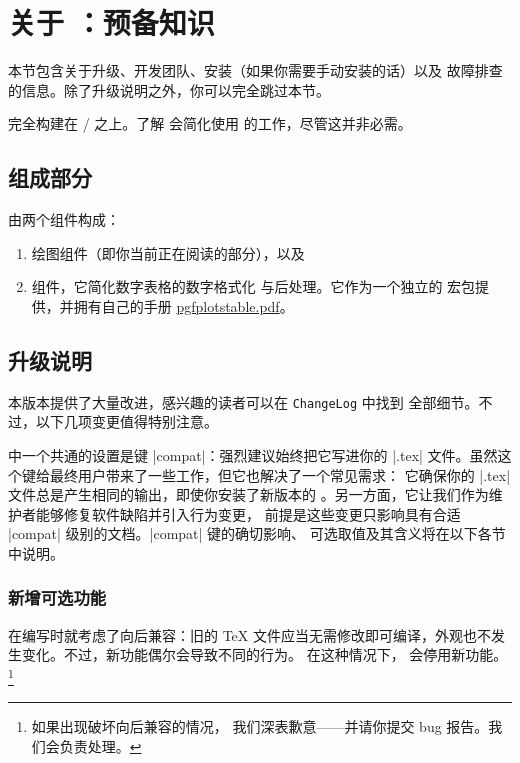 
\chapter[关于 PGFPlots：预备知识]{关于 {\normalfont\PGFPlots{}}：预备知识}

本节包含关于升级、开发团队、安装（如果你需要手动安装的话）以及
故障排查的信息。除了升级说明之外，你可以完全跳过本节。

\PGFPlots{} 完全构建在 \Tikz{}/\PGF{} 之上。了解 \Tikz{} 会简化使用
\PGFPlots{} 的工作，尽管这并非必需。

\section{组成部分}

\PGFPlots{} 由两个组件构成：
%
\begin{enumerate}
    \item 绘图组件（即你当前正在阅读的部分），以及
    \item \PGFPlotstable{} 组件，它简化数字表格的数字格式化
        与后处理。它作为一个独立的
        宏包提供，并拥有自己的手册
        \href{file:pgfplotstable.pdf}{pgfplotstable.pdf}。
\end{enumerate}


\section{升级说明}

本版本提供了大量改进，感兴趣的读者可以在 \texttt{ChangeLog} 中找到
全部细节。不过，以下几项变更值得特别注意。

\PGFPlots{} 中一个共通的设置是键 |compat|：强烈建议始终把它写进你的
|.tex| 文件。虽然这个键给最终用户带来了一些工作，但它也解决了一个常见需求：
它确保你的 |.tex| 文件总是产生相同的输出，即使你安装了新版本的
\PGFPlots{}。另一方面，它让我们作为维护者能够修复软件缺陷并引入行为变更，
前提是这些变更只影响具有合适 |compat| 级别的文档。|compat| 键的确切影响、
可选取值及其含义将在以下各节中说明。


\subsection{新增可选功能}

\PGFPlots{} 在编写时就考虑了向后兼容：旧的 \TeX{}
文件应当无需修改即可编译，外观也不发生变化。不过，新功能偶尔会导致不同的行为。
在这种情况下，\PGFPlots{} 会停用新功能。\footnote{如果出现破坏向后兼容的情况，
我们深表歉意——并请你提交 bug 报告。我们会负责处理。}


